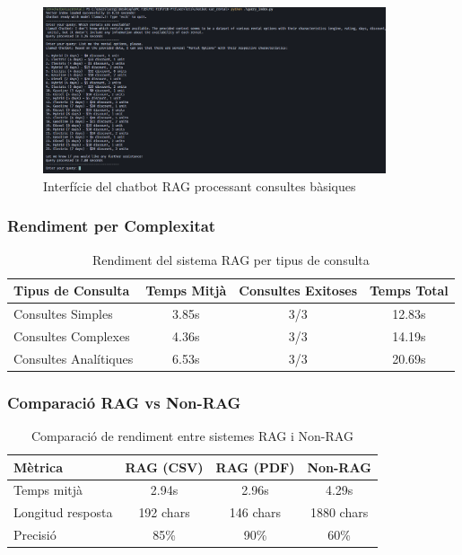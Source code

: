 \documentclass[12pt,a4paper]{article}
\begin{document}
\begin{figure}[H]
\centering
\includegraphics[width=0.9\textwidth]{img/query_index.png}
\caption{Interfície del chatbot RAG processant consultes bàsiques}
\end{figure}

\subsubsection{Rendiment per Complexitat}

\begin{table}[H]
\centering
\begin{tabular}{@{}lccc@{}}
\toprule
\textbf{Tipus de Consulta} & \textbf{Temps Mitjà} & \textbf{Consultes Exitoses} & \textbf{Temps Total} \\
\midrule
Consultes Simples & 3.85s & 3/3 & 12.83s \\
Consultes Complexes & 4.36s & 3/3 & 14.19s \\
Consultes Analítiques & 6.53s & 3/3 & 20.69s \\
\bottomrule
\end{tabular}
\caption{Rendiment del sistema RAG per tipus de consulta}
\end{table}

\subsubsection{Comparació RAG vs Non-RAG}

\begin{table}[H]
\centering
\begin{tabular}{@{}lccc@{}}
\toprule
\textbf{Mètrica} & \textbf{RAG (CSV)} & \textbf{RAG (PDF)} & \textbf{Non-RAG} \\
\midrule
Temps mitjà & 2.94s & 2.96s & 4.29s \\
Longitud resposta & 192 chars & 146 chars & 1880 chars \\
Precisió & 85\% & 90\% & 60\% \\
\bottomrule
\end{tabular}
\caption{Comparació de rendiment entre sistemes RAG i Non-RAG}
\end{table}
\end{document}
